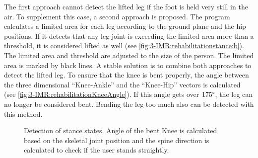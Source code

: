 The first approach cannot detect the lifted leg if the foot is held very still in the air. To supplement this case, a second approach is proposed. The program calculates a limited area for each leg according to the ground plane and the hip positions. If it detects that any leg joint is exceeding the limited area more than a threshold, it is considered lifted as well (see \figurename{\ref{fig:3-IMR:rehabilitationstance:b}}). The limited area and threshold are adjusted to the size of the person. 
The limited area is marked by black lines. 
A stable solution is to combine both approaches to detect the lifted leg.
To ensure that the knee is bent properly, the angle between the three dimensional ``Knee-Ankle'' and the ``Knee-Hip'' vectors is calculated (see \figurename{\ref{fig:3-IMR:rehabilitationKneeAngle}}). If this angle gets over $175\degree$, the leg can no longer be considered bent. Bending the leg too much also can be detected with this method.
\begin{figure}
	\centering
	\quad
	\caption{Detection of stance states. Angle of the bent Knee is calculated based on the skeletal joint position and the spine direction is calculated to check if the user stands straightly.}
	\label{fig:3-IMR:poseDetection}
\end{figure}

